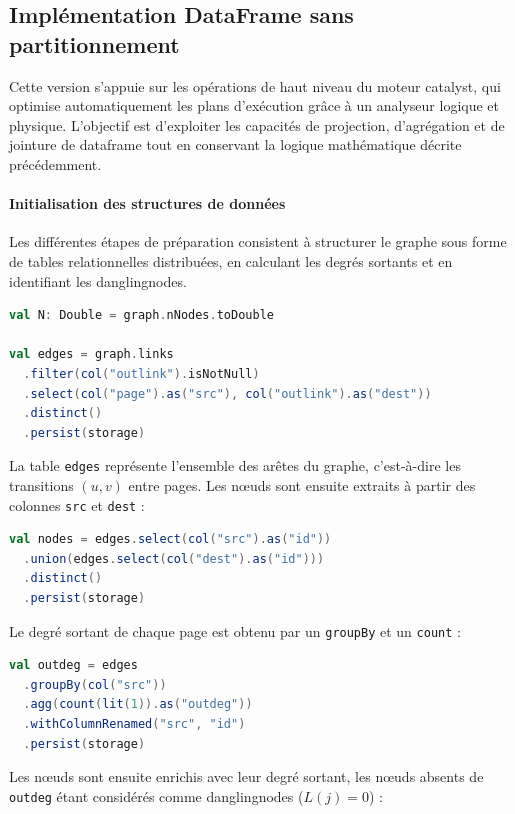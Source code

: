 \documentclass[conference]{IEEEtran}
\begin{document}
\subsection{Implémentation DataFrame sans partitionnement}
 
Cette version s'appuie sur les opérations de haut niveau du moteur \gls{catalyst}, qui optimise automatiquement les plans d'exécution grâce à un analyseur logique et physique.  
L'objectif est d'exploiter les capacités de projection, d'agrégation et de jointure de \gls{dataframe} tout en conservant la logique mathématique décrite précédemment.

\paragraph{Initialisation des structures de données}

Les différentes étapes de préparation consistent à structurer le graphe sous forme de tables relationnelles distribuées, en calculant les degrés sortants et en identifiant les \glspl{danglingnode}.

\begin{lstlisting}[language=Scala]
val N: Double = graph.nNodes.toDouble

val edges = graph.links
  .filter(col("outlink").isNotNull)
  .select(col("page").as("src"), col("outlink").as("dest"))
  .distinct()
  .persist(storage)
\end{lstlisting}

La table \texttt{edges} représente l'ensemble des arêtes du graphe, c'est-à-dire les transitions $(u, v)$ entre pages.  
Les nœuds sont ensuite extraits à partir des colonnes \texttt{src} et \texttt{dest} :

\begin{lstlisting}[language=Scala]
val nodes = edges.select(col("src").as("id"))
  .union(edges.select(col("dest").as("id")))
  .distinct()
  .persist(storage)
\end{lstlisting}

Le degré sortant de chaque page est obtenu par un \texttt{groupBy} et un \texttt{count} :

\begin{lstlisting}[language=Scala]
val outdeg = edges
  .groupBy(col("src"))
  .agg(count(lit(1)).as("outdeg"))
  .withColumnRenamed("src", "id")
  .persist(storage)
\end{lstlisting}

Les nœuds sont ensuite enrichis avec leur degré sortant, les nœuds absents de \texttt{outdeg} étant considérés comme \glspl{danglingnode} ($L(j) = 0$) :
\end{document}
